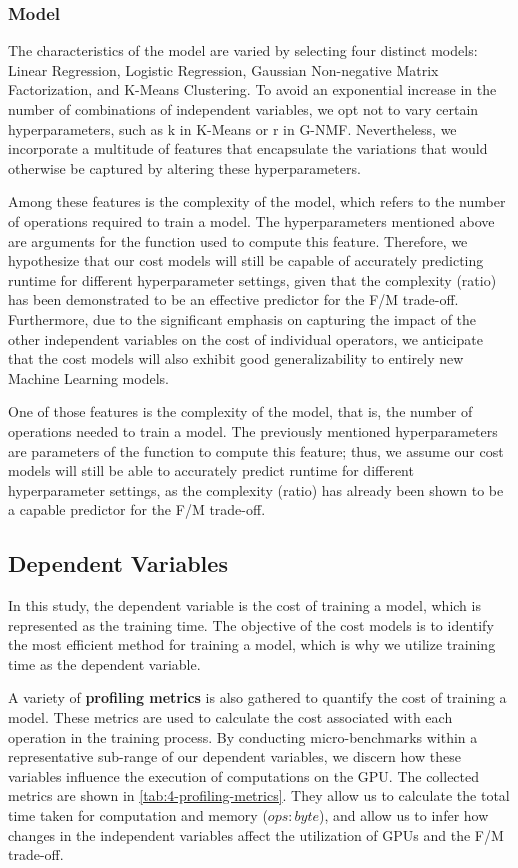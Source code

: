 \subsubsection{Model}
The characteristics of the model are varied by selecting four distinct models: Linear Regression, Logistic Regression, Gaussian Non-negative Matrix Factorization, and K-Means Clustering. To avoid an exponential increase in the number of combinations of independent variables, we opt not to vary certain hyperparameters, such as k in K-Means or r in G-NMF. Nevertheless, we incorporate a multitude of features that encapsulate the variations that would otherwise be captured by altering these hyperparameters.

Among these features is the complexity of the model, which refers to the number of operations required to train a model. The hyperparameters mentioned above are arguments for the function used to compute this feature. Therefore, we hypothesize that our cost models will still be capable of accurately predicting runtime for different hyperparameter settings, given that the complexity (ratio) has been demonstrated to be an effective predictor for the F/M trade-off. Furthermore, due to the significant emphasis on capturing the impact of the other independent variables on the cost of individual operators, we anticipate that the cost models will also exhibit good generalizability to entirely new Machine Learning models.

One of those features is the complexity of the model, that is, the number of operations needed to train a model. The previously mentioned hyperparameters are parameters of the function to compute this feature; thus, we assume our cost models will still be able to accurately predict runtime for different hyperparameter settings, as the complexity (ratio) has already been shown to be a capable predictor for the F/M trade-off.

\subsection{Dependent Variables}
In this study, the dependent variable is the cost of training a model, which is represented as the training time. The objective of the cost models is to identify the most efficient method for training a model, which is why we utilize training time as the dependent variable.

A variety of \textbf{profiling metrics} is also gathered to quantify the cost of training a model. These metrics are used to calculate the cost associated with each operation in the training process. By conducting micro-benchmarks within a representative sub-range of our dependent variables, we discern how these variables influence the execution of computations on the GPU. The collected metrics are shown in \autoref{tab:4-profiling-metrics}. They allow us to calculate the total time taken for computation and memory ($ops:byte$), and allow us to infer how changes in the independent variables affect the utilization of GPUs and the F/M trade-off.

